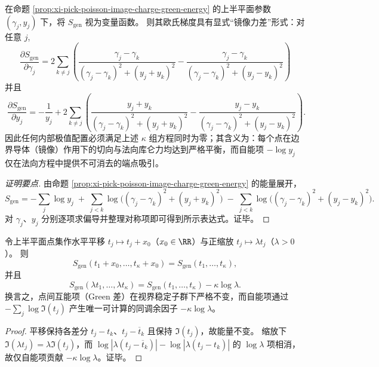 

\begin{proposition}\label{prop:xi-pick-poisson-energy-balance-equations}
在命题 \ref{prop:xi-pick-poisson-image-charge-green-energy} 的上半平面参数 \((\gamma_j,y_j)\) 下，将 \(S_{\mathrm{gen}}\) 视为变量函数。
则其欧氏梯度具有显式“镜像力差”形式：对任意 \(j\),
\[
\boxed{\;
\frac{\partial S_{\mathrm{gen}}}{\partial \gamma_j}
=
2\sum_{k\neq j}\left(
\frac{\gamma_j-\gamma_k}{(\gamma_j-\gamma_k)^2+(y_j+y_k)^2}
-
\frac{\gamma_j-\gamma_k}{(\gamma_j-\gamma_k)^2+(y_j-y_k)^2}
\right)\;}
\]
并且
\[
\boxed{\;
\frac{\partial S_{\mathrm{gen}}}{\partial y_j}
=
-\frac{1}{y_j}
+
2\sum_{k\neq j}\left(
\frac{y_j+y_k}{(\gamma_j-\gamma_k)^2+(y_j+y_k)^2}
-
\frac{y_j-y_k}{(\gamma_j-\gamma_k)^2+(y_j-y_k)^2}
\right).\;}
\]
因此任何内部极值配置必须满足上述 \(\kappa\) 组方程同时为零；其含义为：每个点在边界导体（镜像）作用下的切向与法向库仑力均达到严格平衡，而自能项 \(-\log y_j\) 仅在法向方程中提供不可消去的端点吸引。
\end{proposition}
\begin{proof}[证明要点]
由命题 \ref{prop:xi-pick-poisson-image-charge-green-energy} 的能量展开，
\[
S_{\mathrm{gen}}
=-\sum_j\log y_j
\;+\;\sum_{j<k}\log\!\bigl((\gamma_j-\gamma_k)^2+(y_j+y_k)^2\bigr)
\;-\;\sum_{j<k}\log\!\bigl((\gamma_j-\gamma_k)^2+(y_j-y_k)^2\bigr).
\]
对 \(\gamma_j\)、\(y_j\) 分别逐项求偏导并整理对称项即可得到所示表达式。证毕。
\end{proof}

\begin{corollary}\label{cor:xi-pick-poisson-energy-stabilizer-covariance}
令上半平面点集作水平平移 \(t_j\mapsto t_j+x_0\)（\(x_0\in\RR\)）与正缩放 \(t_j\mapsto \lambda t_j\)（\(\lambda>0\)）。
则
\[
\boxed{\;
S_{\mathrm{gen}}(t_1+x_0,\dots,t_\kappa+x_0)=S_{\mathrm{gen}}(t_1,\dots,t_\kappa),\;}
\]
并且
\[
\boxed{\;
S_{\mathrm{gen}}(\lambda t_1,\dots,\lambda t_\kappa)=S_{\mathrm{gen}}(t_1,\dots,t_\kappa)-\kappa\log\lambda.\;}
\]
换言之，点间互能项（Green 差）在视界稳定子群下严格不变，而自能项通过 \(-\sum_j\log\Im(t_j)\) 产生唯一可计算的同调余因子 \(-\kappa\log\lambda\)。
\end{corollary}
\begin{proof}
平移保持各差分 \(t_j-t_k\)、\(t_j-\overline t_k\) 且保持 \(\Im(t_j)\)，故能量不变。
缩放下 \(\Im(\lambda t_j)=\lambda\Im(t_j)\)，而 \(\log|\lambda(t_j-\overline t_k)|-\log|\lambda(t_j-t_k)|\) 的 \(\log\lambda\) 项相消，故仅自能项贡献 \(-\kappa\log\lambda\)。证毕。
\end{proof}

